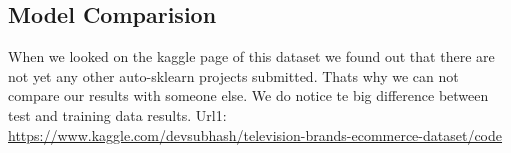 \subsection{Model Comparision}
When we looked on the kaggle page of this dataset we found out that there are not yet any other auto-sklearn projects submitted. Thats why we can not compare our results with someone else. We do notice te big difference between test and training data results.
Url1: \url{https://www.kaggle.com/devsubhash/television-brands-ecommerce-dataset/code}